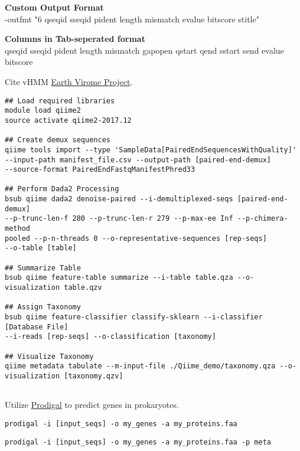\documentclass[idxtotoc,hyperref,openany,oneside]{labbook} %
\begin{document}
\textbf{Custom Output Format} \\
-outfmt "6 qseqid sseqid pident length mismatch evalue bitscore stitle"

\textbf{Columns in Tab-seperated format} \\
qseqid  sseqid  pident  length  mismatch  gapopen qstart  qend  sstart  send  evalue  bitscore


Cite vHMM \href{http://portal.nersc.gov/dna/microbial/prokpubs/EarthVirome_DP/}{Earth Virome Project}. 

\begin{verbatim}
## Load required libraries
module load qiime2
source activate qiime2-2017.12

## Create demux sequences
qiime tools import --type 'SampleData[PairedEndSequencesWithQuality]' 
--input-path manifest_file.csv --output-path [paired-end-demux] 
--source-format PairedEndFastqManifestPhred33

## Perform Dada2 Processing 
bsub qiime dada2 denoise-paired --i-demultiplexed-seqs [paired-end-demux]
--p-trunc-len-f 280 --p-trunc-len-r 279 --p-max-ee Inf --p-chimera-method 
pooled --p-n-threads 0 --o-representative-sequences [rep-seqs] 
--o-table [table]

## Summarize Table
bsub qiime feature-table summarize --i-table table.qza --o-visualization table.qzv

## Assign Taxonomy
bsub qiime feature-classifier classify-sklearn --i-classifier [Database File]
--i-reads [rep-seqs] --o-classification [taxonomy]

## Visualize Taxonomy
qiime metadata tabulate --m-input-file ./Qiime_demo/taxonomy.qza --o-visualization [taxonomy.qzv]


\end{verbatim}






Utilize \href{https://github.com/hyattpd/Prodigal}{Prodigal} to predict genes in prokaryotes.


\begin{verbatim}
prodigal -i [input_seqs] -o my_genes -a my_proteins.faa
\end{verbatim} 


\begin{verbatim}
prodigal -i [input_seqs] -o my_genes -a my_proteins.faa -p meta
\end{verbatim} 
\end{document}
